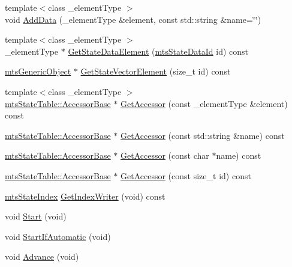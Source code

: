 \begin{DoxyCompactItemize}
\item 
{\footnotesize template$<$class \-\_\-element\-Type $>$ }\\void \hyperlink{classmts_state_table_a1353c7b1670616dc1af6eb9ef5da2fde}{Add\-Data} (\-\_\-element\-Type \&element, const std\-::string \&name=\char`\"{}\char`\"{})
\item 
{\footnotesize template$<$class \-\_\-element\-Type $>$ }\\\-\_\-element\-Type $\ast$ \hyperlink{classmts_state_table_a3a66fb9fa397c34e31ec91f2cb5acf6f}{Get\-State\-Data\-Element} (\hyperlink{mts_state_table_8h_ac3a0e34e8991d51790b043fa01857a35}{mts\-State\-Data\-Id} id) const 
\item 
\hyperlink{classmts_generic_object}{mts\-Generic\-Object} $\ast$ \hyperlink{classmts_state_table_a364ddd16f8f0feaf0ae4ba59359ca9c6}{Get\-State\-Vector\-Element} (size\-\_\-t id) const 
\item 
{\footnotesize template$<$class \-\_\-element\-Type $>$ }\\\hyperlink{classmts_state_table_1_1_accessor_base}{mts\-State\-Table\-::\-Accessor\-Base} $\ast$ \hyperlink{classmts_state_table_a34156ee2a483ae1b9c7dfc52ef1a196a}{Get\-Accessor} (const \-\_\-element\-Type \&element) const 
\item 
\hyperlink{classmts_state_table_1_1_accessor_base}{mts\-State\-Table\-::\-Accessor\-Base} $\ast$ \hyperlink{classmts_state_table_a21b4b85ce1185b4705d9684b7f61b10d}{Get\-Accessor} (const std\-::string \&name) const 
\item 
\hyperlink{classmts_state_table_1_1_accessor_base}{mts\-State\-Table\-::\-Accessor\-Base} $\ast$ \hyperlink{classmts_state_table_ae798fe3fa7241a64805d2f4f9760b5b9}{Get\-Accessor} (const char $\ast$name) const 
\item 
\hyperlink{classmts_state_table_1_1_accessor_base}{mts\-State\-Table\-::\-Accessor\-Base} $\ast$ \hyperlink{classmts_state_table_aa632462e7f9ce6240133a155e214837c}{Get\-Accessor} (const size\-\_\-t id) const 
\item 
\hyperlink{classmts_state_index}{mts\-State\-Index} \hyperlink{classmts_state_table_aece1a7ed0894a67425f3ef8ec2155e54}{Get\-Index\-Writer} (void) const 
\item 
void \hyperlink{classmts_state_table_a8414f107199e3223da2792606c40d736}{Start} (void)
\item 
void \hyperlink{classmts_state_table_a64a7f96db3647f1092daf894ad17f03a}{Start\-If\-Automatic} (void)
\item 
void \hyperlink{classmts_state_table_a0ab7ef3af48d207bf6e13748dd3d03f9}{Advance} (void)

\end{DoxyCompactItemize}
